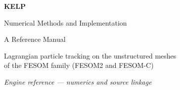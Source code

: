 \begin{titlepage}
\centering
\vspace*{3cm}
{\Huge\bfseries \textsf{KELP}\par}
\vspace{0.6cm}
{\LARGE Numerical Methods and Implementation\par}
\vspace{0.3cm}
{\large A Reference Manual\par}
\vspace{1.4cm}
{\large Lagrangian particle tracking on the unstructured meshes\\[2pt]
of the FESOM family (FESOM2 and FESOM-C)\par}
\vfill
{\large\itshape Engine reference --- numerics and source linkage\par}
\vspace{0.4cm}
\vfill
\end{titlepage}

